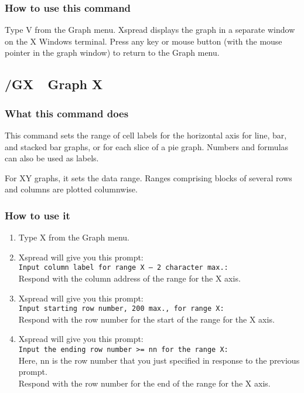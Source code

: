 \subsubsection*{How to use this command}
Type V from the Graph menu.  Xspread displays the graph in a separate window on
the X Windows terminal.  Press any key or mouse button (with the mouse pointer
in the graph window) to return to the Graph menu.

\subsection*{/GX\ \      Graph X}

\subsubsection*{What this command does}
This command sets the range of cell labels for the horizontal axis for 
line, bar, and stacked bar graphs, or for each slice of a pie graph.  
Numbers and formulas can also be used as labels.

For XY graphs, it sets the data range.  Ranges comprising blocks of 
several rows and columns are plotted columnwise.

\subsubsection*{How to use it}
\begin{enumerate}
\item{Type X from the Graph menu.}
\item{Xspread will give you this prompt:\\
        {\tt Input column label for range X -- 2 character max.:} \\
        Respond with the column address of the range for the X axis.}
\item{Xspread will give you this prompt:\\
        {\tt Input starting row number, 200 max., for range X:} \\
        Respond with the row number for the start of the range for the X
        axis.}
\item{Xspread will give you this prompt:\\
        {\tt Input the ending row number >= nn for the range X:}\\
        Here, nn is the row number that you just specified in response to
        the previous prompt.\\
        Respond with the row number for the end of the range for the X
        axis.}
\end{enumerate}


